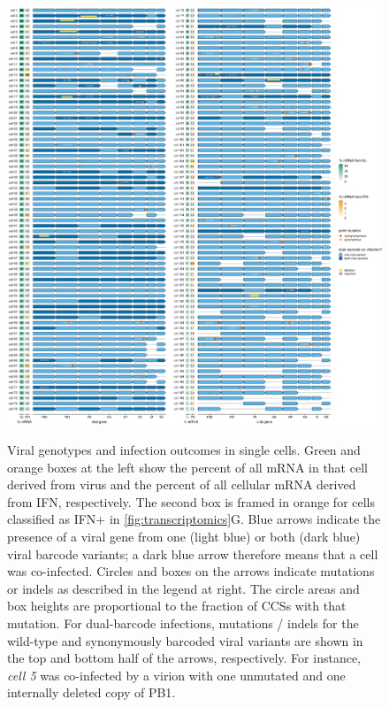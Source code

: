 \documentclass[lineno]{asm-article}
\newcommand{\FIG}[1]{\autoref{fig:#1}}
\begin{document}
\begin{figure}
\begin{fullwidth}
{\centering
\includegraphics[height=0.85\textheight]{figures/single_cell_figures/p_genotypes.pdf}
}
\caption{
Viral genotypes and infection outcomes in single cells.
Green and orange boxes at the left show the percent of all mRNA in that cell derived from virus and the percent of all cellular mRNA derived from IFN, respectively.
The second box is framed in orange for cells classified as IFN+ in \FIG{transcriptomics}G.
Blue arrows indicate the presence of a viral gene from one (light blue) or both (dark blue) viral barcode variants; a dark blue arrow therefore means that a cell was co-infected.
Circles and boxes on the arrows indicate mutations or indels as described in the legend at right.
The circle areas and box heights are proportional to the fraction of CCSs with that mutation.
For dual-barcode infections, mutations / indels for the wild-type and synonymously barcoded viral variants are shown in the top and bottom half of the arrows, respectively.
For instance, \textit{cell 5} was co-infected by a virion with one unmutated and one internally deleted copy of PB1.
}
\label{fig:genotypes}

\end{fullwidth}
\end{figure}
\end{document}

